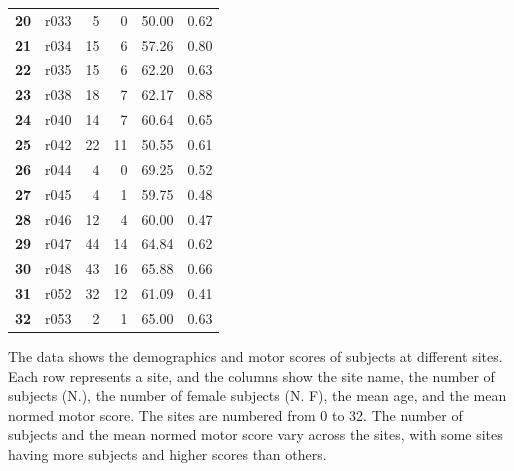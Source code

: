 \documentclass[10pt]{article}
\begin{document}
\begin{table}
\begin{tabular}{|l|l|r|r|r|r|}
\textbf{20} &  r033 &   5 &          0 &     50.00 &               0.62 \\ 
\textbf{21} &  r034 &  15 &          6 &     57.26 &               0.80 \\ 
\textbf{22} &  r035 &  15 &          6 &     62.20 &               0.63 \\ 
\textbf{23} &  r038 &  18 &          7 &     62.17 &               0.88 \\ 
\textbf{24} &  r040 &  14 &          7 &     60.64 &               0.65 \\ 
\textbf{25} &  r042 &  22 &         11 &     50.55 &               0.61 \\ 
\textbf{26} &  r044 &   4 &          0 &     69.25 &               0.52 \\ 
\textbf{27} &  r045 &   4 &          1 &     59.75 &               0.48 \\ 
\textbf{28} &  r046 &  12 &          4 &     60.00 &               0.47 \\ 
\textbf{29} &  r047 &  44 &         14 &     64.84 &               0.62 \\
\textbf{30} &  r048 &  43 &         16 &     65.88 &               0.66 \\ 
\textbf{31} &  r052 &  32 &         12 &     61.09 &               0.41 \\ 
\textbf{32} &  r053 &   2 &          1 &     65.00 &               0.63 \\ 
\hline
\end{tabular}
\end{table}

The data shows the demographics and motor scores of subjects at different sites. Each row represents a site, and the columns show the site name, the number of subjects (N.), the number of female subjects (N. F), the mean age, and the mean normed motor score. The sites are numbered from 0 to 32. The number of subjects and the mean normed motor score vary across the sites, with some sites having more subjects and higher scores than others.
\end{document}
